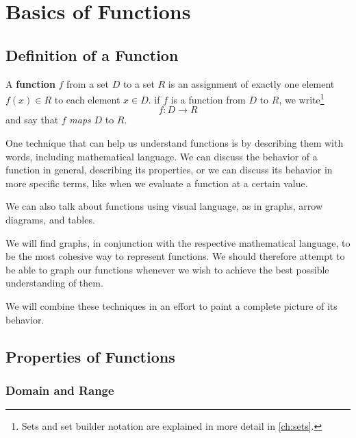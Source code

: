 \chapter{Basics of Functions}
\section{Definition of a Function}

  A \textbf{function} \(f\) from a set \(D\) to a set \(R\) is an assignment of exactly one element \(f(x) \in R\) to each element \(x \in D\).
  if $f$ is a function from $D$ to $R$, we write\footnote{Sets and set builder notation are explained in more detail in \ref{ch:sets}.}
  \[f:D \to R\]
  and say that $f$ \emph{maps} $D$ to $R$.

One technique that can help us understand functions is by describing them with words,
including mathematical language.
We can discuss the behavior of a function in general,
describing its properties, or we can discuss its behavior in more specific terms,
like when we evaluate a function at a certain value.

We can also talk about functions using visual language, as in graphs, arrow diagrams, and tables.

We will find graphs, in conjunction with the respective mathematical language, to be the most cohesive way to represent functions.
We should therefore attempt to be able to graph our functions whenever we wish to achieve the best possible understanding of them.

We will combine these techniques in an effort to paint a complete picture of its behavior.

\section{Properties of Functions}


\subsection{Domain and Range}

